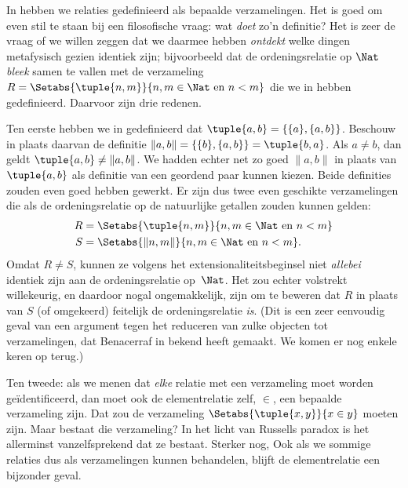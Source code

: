 \documentclass[../../../include/open-logic-section]{subfiles}
\begin{document}

In  hebben we relaties gedefinieerd als bepaalde
verzamelingen. Het is goed om even stil te staan bij een filosofische
vraag: wat \emph{doet} zo'n definitie? Het is zeer de vraag of we
willen zeggen dat we daarmee hebben \emph{ontdekt} welke dingen
metafysisch gezien identiek zijn; bijvoorbeeld dat de ordeningsrelatie op $\Nat$
\emph{bleek} samen te vallen met de verzameling $R=
\Setabs{\tuple{n,m}}{n, m \in \Nat\text{ en } n < m}$ die we in
 hebben gedefinieerd. Daarvoor zijn drie redenen.

Ten eerste hebben we in  gedefinieerd
dat $\tuple{a, b} = \{\{a\}, \{a, b\}\}$. Beschouw in plaats daarvan de
definitie $\lVert a, b\rVert = \{\{b\}, \{a, b\}\} = \tuple{b,a}$. Als
$a \neq b$, dan geldt $\tuple{a, b} \neq \lVert a,b\rVert$. We hadden
echter net zo goed $\lVert a,b\rVert$ in plaats van $\tuple{a,b}$ als
definitie van een geordend paar kunnen kiezen. Beide definities zouden
even goed hebben gewerkt. Er zijn dus twee even geschikte
verzamelingen die als de ordeningsrelatie op de natuurlijke getallen
zouden kunnen gelden:
\begin{align*}
		R &= \Setabs{\tuple{n,m}}{n, m \in \Nat \text{ en }n < m}\\
		S &= \Setabs{\lVert n,m\rVert}{n, m \in \Nat \text{ en }n < m}.
\end{align*}
Omdat $R \neq S$, kunnen ze volgens het extensionaliteitsbeginsel niet
\emph{allebei} identiek zijn aan de ordeningsrelatie op~$\Nat$. Het zou
echter volstrekt willekeurig, en daardoor nogal ongemakkelijk, zijn om
te beweren dat $R$ in plaats van $S$ (of omgekeerd) feitelijk de
ordeningsrelatie \emph{is}. (Dit is een zeer eenvoudig geval van een
argument tegen het reduceren van zulke objecten tot verzamelingen, dat
Benacerraf in \citeyear{Benacerraf1965} bekend heeft gemaakt. We komen
er nog enkele keren op terug.)

Ten tweede: als we menen dat \emph{elke} relatie met een verzameling
moet worden geïdentificeerd, dan moet ook de elementrelatie zelf,
$\in$, een bepaalde verzameling zijn. Dat zou de verzameling
$\Setabs{\tuple{x,y}}{x \in y}$ moeten zijn. Maar bestaat die
verzameling? In het licht van Russells paradox is het allerminst
vanzelfsprekend dat ze bestaat. Sterker nog,
Ook als we sommige relaties dus als verzamelingen kunnen behandelen,
blijft de elementrelatie een bijzonder geval.
\end{document}
